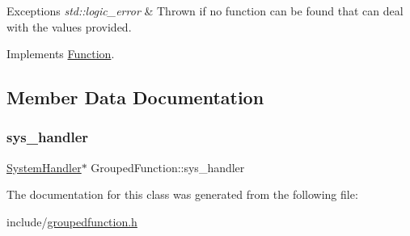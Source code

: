 \begin{DoxyExceptions}{Exceptions}
{\em std\+::logic\+\_\+error} & Thrown if no function can be found that can deal with the values provided. \\
\hline
\end{DoxyExceptions}


Implements \hyperlink{classFunction_a84f9a63e68becc27e58ea738ba4cd698}{Function}.



\subsection{Member Data Documentation}
\mbox{\label{classGroupedFunction_a932d46ac0e35f1a1c989427e51c1b2b4}} 
\subsubsection{\texorpdfstring{sys\+\_\+handler}{sys\_handler}}
{\footnotesize\ttfamily \hyperlink{classSystemHandler}{System\+Handler}$\ast$ Grouped\+Function\+::sys\+\_\+handler}



The documentation for this class was generated from the following file\+:\begin{DoxyCompactItemize}
\item 
include/\hyperlink{groupedfunction_8h}{groupedfunction.\+h}\end{DoxyCompactItemize}
